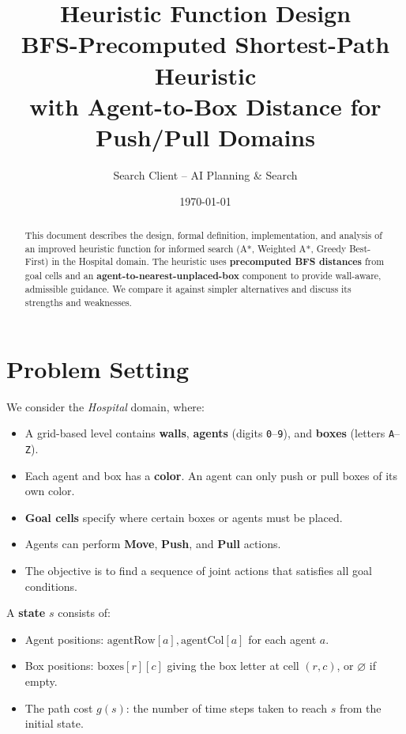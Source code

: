 \documentclass[11pt, a4paper]{article}
\title{
    \vspace{-1cm}
    {\LARGE\bfseries Heuristic Function Design}\\[0.3cm]
    {\Large\color{gray} BFS-Precomputed Shortest-Path Heuristic\\with Agent-to-Box Distance for Push/Pull Domains}
}
\author{Search Client -- AI Planning \& Search}
\date{\today}
\begin{document}
\maketitle

\begin{abstract}
This document describes the design, formal definition, implementation, and analysis of an improved heuristic function for informed search (A*, Weighted A*, Greedy Best-First) in the Hospital domain. The heuristic uses \textbf{precomputed BFS distances} from goal cells and an \textbf{agent-to-nearest-unplaced-box} component to provide wall-aware, admissible guidance. We compare it against simpler alternatives and discuss its strengths and weaknesses.
\end{abstract}

\tableofcontents
\newpage

\section{Problem Setting}

We consider the \emph{Hospital} domain, where:
\begin{itemize}[leftmargin=1.5em]
    \item A grid-based level contains \textbf{walls}, \textbf{agents} (digits \texttt{0}--\texttt{9}), and \textbf{boxes} (letters \texttt{A}--\texttt{Z}).
    \item Each agent and box has a \textbf{color}. An agent can only push or pull boxes of its own color.
    \item \textbf{Goal cells} specify where certain boxes or agents must be placed.
    \item Agents can perform \textbf{Move}, \textbf{Push}, and \textbf{Pull} actions.
    \item The objective is to find a sequence of joint actions that satisfies all goal conditions.
\end{itemize}

A \textbf{state} $s$ consists of:
\begin{itemize}[leftmargin=1.5em]
    \item Agent positions: $\text{agentRow}[a], \text{agentCol}[a]$ for each agent $a$.
    \item Box positions: $\text{boxes}[r][c]$ giving the box letter at cell $(r,c)$, or $\varnothing$ if empty.
    \item The path cost $g(s)$: the number of time steps taken to reach $s$ from the initial state.
\end{itemize}
\end{document}
